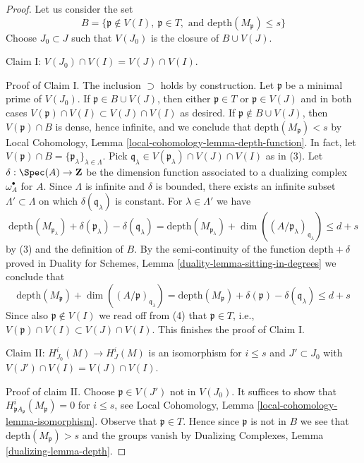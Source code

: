 \begin{proof}
Let us consider the set
$$
B = \{\mathfrak p \not \in V(I),\ \mathfrak p \in T,\text{ and }
\text{depth}(M_\mathfrak p) \leq s\}
$$
Choose $J_0 \subset J$ such that $V(J_0)$ is the closure of $B \cup V(J)$.

\medskip\noindent
Claim I: $V(J_0) \cap V(I) = V(J) \cap V(I)$.

\medskip\noindent
Proof of Claim I. The inclusion $\supset$ holds by construction.
Let $\mathfrak p$ be a minimal prime of $V(J_0)$.
If $\mathfrak p \in B \cup V(J)$, then either $\mathfrak p \in T$
or $\mathfrak p \in V(J)$ and in both cases
$V(\mathfrak p) \cap V(I) \subset V(J) \cap V(I)$ as desired.
If $\mathfrak p \not \in B \cup V(J)$, then
$V(\mathfrak p) \cap B$ is dense, hence infinite, and we conclude that
$\text{depth}(M_\mathfrak p) < s$ by
Local Cohomology, Lemma \ref{local-cohomology-lemma-depth-function}.
In fact, let
$V(\mathfrak p) \cap B = \{\mathfrak p_\lambda\}_{\lambda \in \Lambda}$.
Pick $\mathfrak q_\lambda \in V(\mathfrak p_\lambda) \cap V(J) \cap V(I)$
as in (3).
Let $\delta : \Spec(A) \to \mathbf{Z}$ be the dimension function
associated to a dualizing complex $\omega_A^\bullet$ for $A$.
Since $\Lambda$ is infinite and $\delta$ is bounded,
there exists an infinite subset $\Lambda' \subset \Lambda$ on which
$\delta(\mathfrak q_\lambda)$ is constant. For
$\lambda \in \Lambda'$ we have
$$
\text{depth}(M_{\mathfrak p_\lambda}) +
\delta(\mathfrak p_\lambda) - \delta(\mathfrak q_\lambda) =
\text{depth}(M_{\mathfrak p_\lambda}) +
\dim((A/\mathfrak p_\lambda)_{\mathfrak q_\lambda})
\leq d + s
$$
by (3) and the definition of $B$. By the semi-continuity of
the function $\text{depth} + \delta$ proved in
Duality for Schemes, Lemma \ref{duality-lemma-sitting-in-degrees}
we conclude that
$$
\text{depth}(M_\mathfrak p) +
\dim((A/\mathfrak p)_{\mathfrak q_\lambda}) =
\text{depth}(M_\mathfrak p) + \delta(\mathfrak p) - \delta(\mathfrak q_\lambda)
\leq d + s
$$
Since also $\mathfrak p \not \in V(I)$ we read off from (4) that
$\mathfrak p \in T$, i.e.,
$V(\mathfrak p) \cap V(I) \subset V(J) \cap V(I)$. This finishes the
proof of Claim I.

\medskip\noindent
Claim II: $H^i_{J_0}(M) \to H^i_J(M)$ is an isomorphism for $i \leq s$
and $J' \subset J_0$ with $V(J') \cap V(I) = V(J) \cap V(I)$.

\medskip\noindent
Proof of claim II. Choose $\mathfrak p \in V(J')$ not in $V(J_0)$.
It suffices to show that $H^i_{\mathfrak pA_\mathfrak p}(M_\mathfrak p) = 0$
for $i \leq s$, see
Local Cohomology, Lemma \ref{local-cohomology-lemma-isomorphism}.
Observe that $\mathfrak p \in T$. Hence since $\mathfrak p$ is not in $B$
we see that $\text{depth}(M_\mathfrak p) > s$ and the groups vanish by
Dualizing Complexes, Lemma \ref{dualizing-lemma-depth}.


\end{proof}
